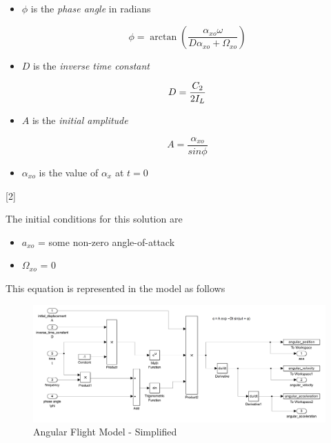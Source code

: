 \documentclass[]{article}
\providecommand{\tightlist}{%
  \setlength{\itemsep}{0pt}\setlength{\parskip}{0pt}}
\begin{document}
\begin{itemize}
\tightlist
\item
  \(\phi\) is the \emph{phase angle} in radians

  \begin{equation}
  \label{eq_phase}
  \phi = 
  \arctan { 
  \left( \dfrac{ \alpha_{xo} \omega } { D\alpha_{xo} + \Omega_{xo} } \right) 
  }
  \end{equation}
\item
  \(D\) is the \emph{inverse time constant}

  \begin{equation}
  \label{eq_inverse_time_constant}
  D = { C_2 \over 2 I_L }
  \end{equation}
\item
  \(A\) is the \emph{initial amplitude}

  \begin{equation}
  A = \dfrac{\alpha_{xo}}{sin \phi}
  \end{equation}
\item
  \(\alpha_{xo}\) is the value of \(\alpha_x\) at \(t=0\)
\end{itemize}

{[}2{]}

The initial conditions for this solution are

\begin{itemize}
\tightlist
\item
  \(a_{xo}\) = some non-zero angle-of-attack
\item
  \(\Omega_{xo}\) = 0
\end{itemize}

This equation is represented in the model as follows

\begin{figure}[htbp]
\centering
\includegraphics{images/angular_model_simplified.png}
\caption{Angular Flight Model - Simplified
\label{angular_model_simplified}}
\end{figure}
\end{document}
